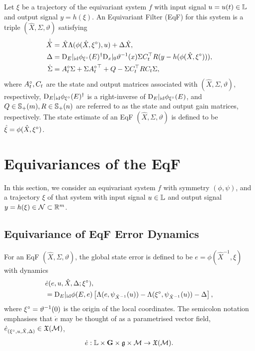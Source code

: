 \documentclass{article}
\begin{document}
Let $\xi$ be a trajectory of the equivariant system $f$ with input signal $u = u(t) \in \mathbb{L}$ and output signal $y = h(\xi)$.
An Equivariant Filter (EqF) \citep{van2020equivariant} for this system is a triple $(\hat{X}, \Sigma, \vartheta)$ satisfying
\begin{align}
    \dot{\hat{X}} &= \hat{X} \Lambda(\phi(\hat{X}, \mr{\xi}), u) + \Delta \hat{X}, \label{eq:eqf_ode_observer} \\
    \Delta &= \tD_E |_\id \phi_{\mr{\xi}}(E)^{\dagger} \tD_x |_0 \vartheta^{-1} (x) \Sigma C_t^\top R (y - h(\phi(\hat{X}, \mr{\xi}))), \notag \\ %
    \dot{\Sigma} &= \mr{A}_t \Sigma + \Sigma {\mr{A}_t}^\top + Q - \Sigma C_t^\top R C_t \Sigma, \label{eq:eqf_ode_riccati}
\end{align}
where ${A}^\circ_t, C_t$ are the state and output matrices associated with $(\hat{X}, \Sigma, \vartheta)$, respectively, $\mathrm{D}_E |_{\mathrm{id}} \phi_{{\xi}^\circ}(E)^{\dagger}$ is a right-inverse of $\mathrm{D}_E |_{\mathrm{id}} \phi_{{\xi}^\circ}(E)$, and $Q \in \mathbb{S}_+(m), R \in \mathbb{S}_+(n)$ are referred to as the state and output gain matrices, respectively.
The state estimate of an EqF $(\hat{X}, \Sigma, \vartheta)$ is defined to be $\hat{\xi} = \phi(\hat{X}, {\xi}^\circ)$.


\section{Equivariances of the EqF}

In this section, we consider an equivariant system $f$ with symmetry $(\phi, \psi)$, and a trajectory $\xi$ of that system with input signal $u \in \mathbb{L}$ and output signal $y=h(\xi) \in \mathcal{N} \subset \mathbb{R}^m$.

\subsection{Equivariance of EqF Error Dynamics}

For an EqF $(\hat{X}, \Sigma, \vartheta)$, the global state error \citep{van2020equivariant} is defined to be $e = \phi(\hat{X}^{-1}, \xi)$ with dynamics 
\begin{align}
    &\dot{e}(e, u, \hat{X}, \Delta; {\xi}^\circ), \label{eq:error_dynamics} \\
    &= \mathrm{D}_E |_{\mathrm{id}} \phi(E,e) \left[\Lambda(e, \psi_{\hat{X}^{-1}}(u)) - \Lambda({\xi}^\circ, \psi_{\hat{X}^{-1}}(u)) - \Delta\right], \notag
\end{align}
where ${\xi}^\circ = \vartheta^{-1}(0)$ is the origin of the local coordinates.
The semicolon notation emphasises that $\dot{e}$ may be thought of as a parametrised vector field, $\dot{e}_{({\xi}^\circ, u, \hat{X}, \Delta)} \in \mathfrak{X}(\mathcal{M})$,
\begin{align*}
    \dot{e} : \mathbb{L} \times \mathbf{G} \times \mathfrak{g} \times \mathcal{M} \to \mathfrak{X}(\mathcal{M}).
\end{align*}
\end{document}

